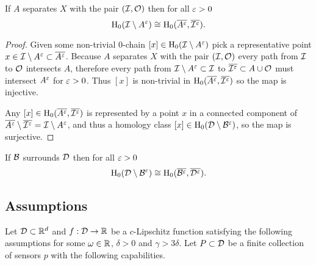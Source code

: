 \begin{lemma}\label{lem:surrounds}
    If $A$ separates $X$ with the pair $({\mathcal{I}}, \mathcal{O})$ then for all $\varepsilon > 0$
    \[\mathrm{H}_0({\mathcal{I}}\setminus A^\varepsilon)\cong \mathrm{H}_0(\overline{A^\varepsilon}, \overline{{\mathcal{I}}^\varepsilon}).\]
\end{lemma}
\begin{proof}
    Given some non-trivial $0$-chain $[x]\in\mathrm{H}_0({\mathcal{I}}\setminus A^\varepsilon)$ pick a representative point $x\in {\mathcal{I}}\setminus A^\varepsilon \subset \overline{A^\varepsilon}$.
    Because $A$ separates $X$ with the pair $({\mathcal{I}}, \mathcal{O})$ every path from ${\mathcal{I}}$ to $\mathcal{O}$ intersects $A$, therefore every path from ${\mathcal{I}}\setminus A^\varepsilon\subset{\mathcal{I}}$ to $\overline{{\mathcal{I}}^\varepsilon} \subset A\cup \mathcal{O}$ must intersect $A^\varepsilon$ for $\varepsilon > 0$.
    Thus $[x]$ is non-trivial in $\mathrm{H}_0(\overline{A^\varepsilon}, \overline{{\mathcal{I}}^\varepsilon})$ so the map is injective.

    Any $[x]\in\mathrm{H}_0(\overline{A^\varepsilon}, \overline{{\mathcal{I}}^\varepsilon})$ is represented by a point $x$ in a connected component of $\overline{A^\varepsilon}\setminus \overline{{\mathcal{I}}^\varepsilon} = {\mathcal{I}}\setminus A^\varepsilon$, and thus a homology class $[x]\in\mathrm{H}_0({\mathcal{D}}\setminus{\mathcal{B}}^\varepsilon)$, so the map is surjective.
\end{proof}

\begin{corollary}\label{lem:surrounds}
    If ${\mathcal{B}}$ surrounds ${\mathcal{D}}$ then for all $\varepsilon > 0$
    \[\mathrm{H}_0({\mathcal{D}}\setminus{\mathcal{B}}^\varepsilon)\cong\mathrm{H}_0(\overline{{\mathcal{B}}^\varepsilon}, \overline{{\mathcal{D}}^\varepsilon}).\]
\end{corollary}

\subsection{Assumptions}\label{ssec:assumptions}

Let ${\mathcal{D}}\subset\mathbb{R}^d$ and $f:{\mathcal{D}}\to\mathbb{R}$ be a $c$-Lipschitz function satisfying the following assumptions for some $\omega\in\mathbb{R}$, $\delta > 0$ and $\gamma > 3\delta$.
Let $P\subset {\mathcal{D}}$ be a finite collection of sensors $p$ with the following capabilities.

\vspace{3ex}
\begin{center}
\setlength{\fboxsep}{2ex}
\end{center}\vspace{3ex}

